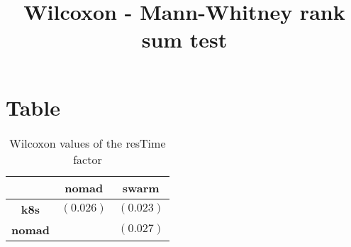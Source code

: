 \documentclass{article}
\title{Wilcoxon - Mann-Whitney rank sum test}
\author{}
\begin{document}
\maketitle
\section{Table}
\begin{table}[!htp]
  \caption{Wilcoxon values of the resTime factor}
  \label{table:resTime}
  \centering
  \begin{scriptsize}
  \begin{tabular}{c|cc}
      & \textbf{nomad} & \textbf{swarm} \\\hline
      \textbf{k8s} & $(0.026) $ & $ (0.023)$ \\
      \textbf{nomad} & $ $ & $ (0.027)$ \\
  \end{tabular}
  \end{scriptsize}
\end{table}
\end{document}
